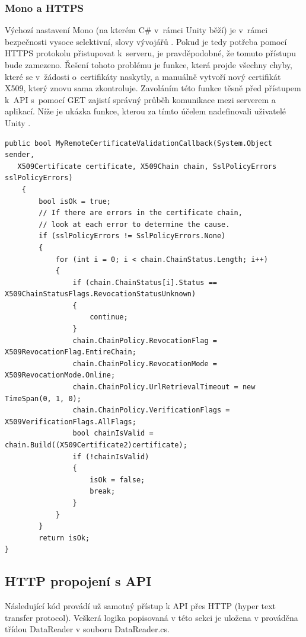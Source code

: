 \documentclass[thesis=B,czech]{FITthesis}[2012/06/26]
\begin{document}
	\subsubsection{Mono a HTTPS}
	
	Výchozí nastavení Mono (na kterém C\# v~rámci Unity běží) je v~rámci bezpečnosti vysoce selektivní, slovy vývojářů  \cite{mono}. Pokud je tedy potřeba pomocí HTTPS protokolu přistupovat k~serveru, je pravděpodobné, že tomuto přístupu bude zamezeno. Řešení tohoto problému je funkce, která projde všechny chyby, které se v~žádosti o~certifikáty naskytly, a manuálně vytvoří nový certifikát X509, který znovu sama zkontroluje. Zavoláním této funkce těsně před přístupem k~API s~pomocí GET zajistí správný průběh komunikace mezi serverem a aplikací. Níže je ukázka funkce, kterou za tímto účelem nadefinovali uživatelé Unity \cite{unityFAQ}.
	
	\begin{minipage}[c]{0.95\textwidth}
	\begin{lstlisting}[frame=single]
public bool MyRemoteCertificateValidationCallback(System.Object sender,
   X509Certificate certificate, X509Chain chain, SslPolicyErrors sslPolicyErrors)
    {
        bool isOk = true;
        // If there are errors in the certificate chain,
        // look at each error to determine the cause.
        if (sslPolicyErrors != SslPolicyErrors.None)
        {
            for (int i = 0; i < chain.ChainStatus.Length; i++)
            {
                if (chain.ChainStatus[i].Status == X509ChainStatusFlags.RevocationStatusUnknown)
                {
                    continue;
                }
                chain.ChainPolicy.RevocationFlag = X509RevocationFlag.EntireChain;
                chain.ChainPolicy.RevocationMode = X509RevocationMode.Online;
                chain.ChainPolicy.UrlRetrievalTimeout = new TimeSpan(0, 1, 0);
                chain.ChainPolicy.VerificationFlags = X509VerificationFlags.AllFlags;
                bool chainIsValid = chain.Build((X509Certificate2)certificate);
                if (!chainIsValid)
                {
                    isOk = false;
                    break;
                }
            }
        }
        return isOk;
}
	\end{lstlisting}
	\end{minipage}
	
	\subsection{HTTP propojení s API}
	Následující kód provádí už samotný přístup k API přes HTTP (hyper text transfer protocol). Veškerá logika popisovaná v této sekci je uložena v prováděna třídou DataReader v souboru DataReader.cs.
	
\end{document}
